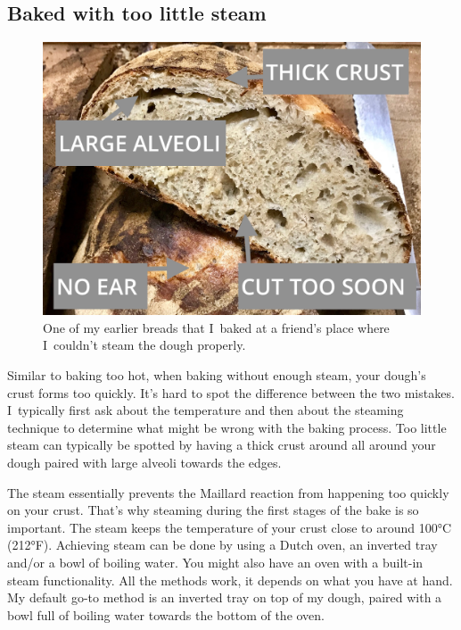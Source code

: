 \subsection{Baked with too little steam}

\begin{figure}[h]
  \includegraphics[width=\textwidth]{no-steam}
  \caption{One of my earlier breads that I~baked at a friend's place where
  I~couldn't steam the dough properly.}%
  \label{no-steam}
\end{figure}

Similar to baking too hot, when baking without enough steam, your dough's crust
forms too quickly. It's hard to spot the difference between the two mistakes.
I~typically first ask about the temperature and then about the steaming technique
to determine what might be wrong with the baking process. Too little steam can
typically be spotted by having a thick crust around all around your dough paired
with large alveoli towards the edges.

The steam essentially prevents the Maillard reaction from happening too quickly
on your crust. That's why steaming during the first stages of the bake is so important.
The steam keeps the temperature of your crust close to around 100°C (212°F). Achieving steam
can be done by using a Dutch oven, an inverted tray and/or a bowl of boiling water.
You might also have an oven with a built-in steam functionality. All the methods work,
it depends on what you have at hand. My default go-to method is an inverted
tray on top of my dough, paired with a bowl full of boiling water towards the bottom
of the oven.

